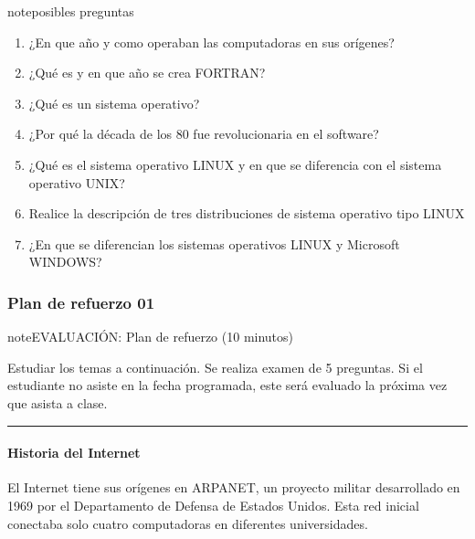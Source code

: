 \documentclass[letterpaper,10pt,spanish]{sphinxmanual}
\begin{document}
\begin{sphinxadmonition}{note}{posibles preguntas}
\begin{enumerate}
\item {} 
\sphinxAtStartPar
¿En que año y como operaban las computadoras en sus orígenes?

\item {} 
\sphinxAtStartPar
¿Qué es y en que año se crea FORTRAN?

\item {} 
\sphinxAtStartPar
¿Qué es un sistema operativo?

\item {} 
\sphinxAtStartPar
¿Por qué la década de los 80 fue revolucionaria en el software?

\item {} 
\sphinxAtStartPar
¿Qué es el sistema operativo LINUX y en que se diferencia con el sistema operativo UNIX?

\item {} 
\sphinxAtStartPar
Realice la descripción de tres distribuciones de sistema operativo tipo LINUX

\item {} 
\sphinxAtStartPar
¿En que se diferencian los sistemas operativos LINUX y Microsoft WINDOWS?

\end{enumerate}
\end{sphinxadmonition}

\sphinxstepscope


\subsubsection{Plan de refuerzo 01}
\label{\detokenize{cursos/informatica10/periodo01/R01:plan-de-refuerzo-01}}\label{\detokenize{cursos/informatica10/periodo01/R01::doc}}
\begin{sphinxadmonition}{note}{EVALUACIÓN: Plan de refuerzo (10 minutos)}

\sphinxAtStartPar
Estudiar los temas a continuación. Se realiza examen de 5 preguntas. Si el estudiante no asiste en la fecha programada, este será evaluado la próxima vez que asista a clase.
\end{sphinxadmonition}


\bigskip\hrule\bigskip



\paragraph{Historia del Internet}
\label{\detokenize{cursos/informatica10/periodo01/R01:historia-del-internet}}
\sphinxAtStartPar
El Internet tiene sus orígenes en ARPANET, un proyecto militar desarrollado en 1969 por el Departamento de Defensa de Estados Unidos. Esta red inicial conectaba solo cuatro computadoras en diferentes universidades.
\end{document}

